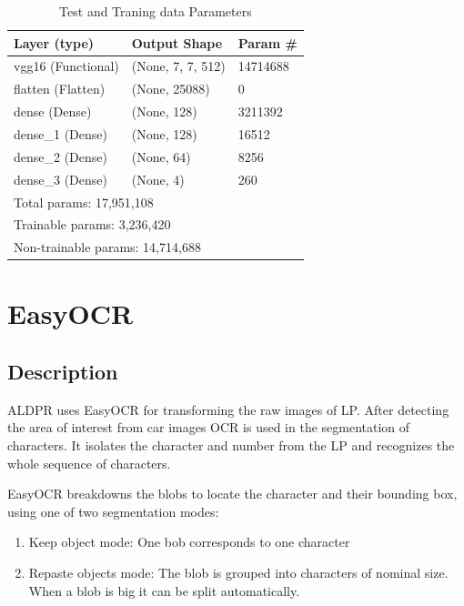 \begin{table}[h!]
	\begin{tabular}{m{4cm}|m{4cm}|m{4cm}}
		\hline
		
		Layer (type) & Output Shape & Param \#\\
		
		\hline
		\hline
		
		vgg16 (Functional) & (None, 7, 7, 512) & 14714688\\
		
		\hline
	 	flatten (Flatten) & (None, 25088) & 0\\
	 	dense (Dense) & (None, 128) &  3211392\\
	 	dense\_1 (Dense) & (None, 128) & 16512\\
	 	dense\_2 (Dense) & (None, 64) & 8256\\    
	 	dense\_3 (Dense) & (None, 4) & 260\\ 
	 	\hline
	    \hline
	    \multicolumn{3}{l}{Total params: 17,951,108}\tabularnewline
	    \multicolumn{3}{l}{Trainable params: 3,236,420}\tabularnewline
	    \multicolumn{3}{l}{Non-trainable params: 14,714,688}\tabularnewline
	    \hline
	\end{tabular}
	\caption{\label{tab:Test and Traning data Parameters}Test and Traning data Parameters}
\end{table}


\section{EasyOCR}


\subsection{Description}

ALDPR uses EasyOCR for transforming the raw images of LP. After detecting the area of interest from car images OCR is used in the segmentation of characters. It isolates the character and number from the LP and recognizes the whole sequence of characters.


EasyOCR breakdowns the blobs to locate the character and their bounding box, using one of two segmentation modes:
\begin{enumerate}
	\item Keep object mode: One bob corresponds to one character
	\item Repaste objects mode: The blob is grouped into characters of nominal size. When a blob is big it can be split automatically.
\end{enumerate}

